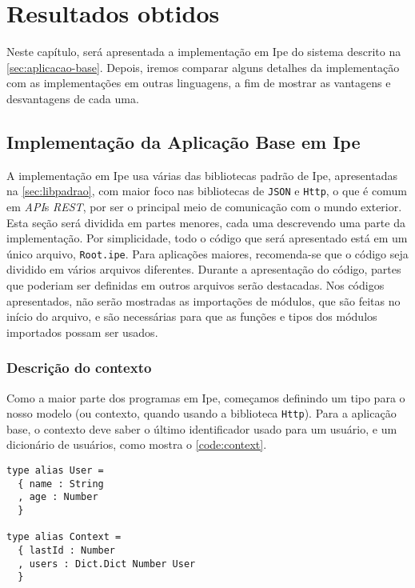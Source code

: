 
\chapter{Resultados obtidos}\label{chapter:resultados-obtidos}

Neste capítulo, será apresentada a implementação em Ipe do sistema descrito na
\autoref{sec:aplicacao-base}. Depois, iremos comparar alguns detalhes da implementação com as
implementações em outras linguagens, a fim de mostrar as vantagens e desvantagens de cada uma.

\section{Implementação da Aplicação Base em Ipe}

A implementação em Ipe usa várias das bibliotecas padrão de Ipe, apresentadas na \autoref{sec:libpadrao},
com maior foco nas bibliotecas de \texttt{JSON} e \texttt{Http}, o que é comum em \textit{API}s
\textit{REST}, por ser o principal meio de comunicação com o mundo exterior. Esta seção será dividida
em partes menores, cada uma descrevendo uma parte da implementação. Por simplicidade, todo o código
que será apresentado está em um único arquivo, \texttt{Root.ipe}. Para aplicações maiores, recomenda-se
que o código seja dividido em vários arquivos diferentes. Durante a apresentação do código, partes
que poderiam ser definidas em outros arquivos serão destacadas. Nos códigos apresentados, não serão
mostradas as importações de módulos, que são feitas no início do arquivo, e são necessárias para
que as funções e tipos dos módulos importados possam ser usados.

\subsection{Descrição do contexto}

Como a maior parte dos programas em Ipe, começamos definindo um tipo para o nosso modelo (ou contexto,
quando usando a biblioteca \texttt{Http}). Para a aplicação base, o contexto deve saber o último
identificador usado para um usuário, e um dicionário de usuários, como mostra o \autoref{code:context}.

\begin{lstlisting}[label={code:context},caption={Definição do contexto}]
type alias User =
  { name : String
  , age : Number
  }

type alias Context =
  { lastId : Number
  , users : Dict.Dict Number User
  }
\end{lstlisting}


